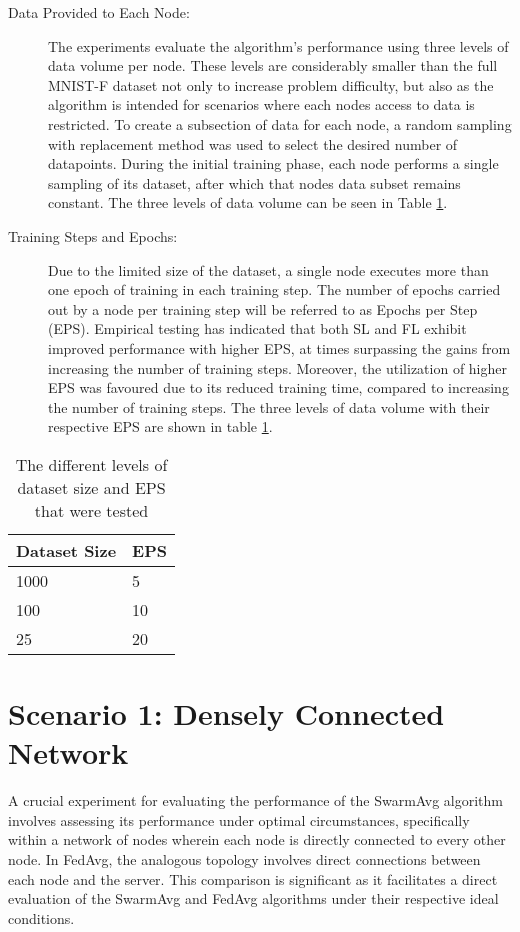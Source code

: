 \begin{description}
	\item [Data Provided to Each Node:] The experiments evaluate the algorithm's performance using three levels of data volume per node. These levels are considerably smaller than the full MNIST-F dataset not only to increase problem difficulty, but also as the algorithm is intended for scenarios where each nodes access to data is restricted. To create a subsection of data for each node, a random sampling with replacement method was used to select the desired number of datapoints. During the initial training phase, each node performs a single sampling of its dataset, after which that nodes data subset remains constant. The three levels of data volume can be seen in Table \ref{epsparams}.
	
	\item [Training Steps and Epochs:] Due to the limited size of the dataset, a single node executes more than one epoch of training in each training step. The number of epochs carried out by a node per training step will be referred to as Epochs per Step (EPS). Empirical testing has indicated that both SL and FL exhibit improved performance with higher EPS, at times surpassing the gains from increasing the number of training steps. Moreover, the utilization of higher EPS was favoured due to its reduced training time, compared to increasing the number of training steps. The three levels of data volume with their respective EPS are shown in table \ref{epsparams}.
	
\end{description}

\begin{table}[H]
	\centering
	\begin{tabular}{l|l}
		Dataset Size & EPS \\ \hline \hline
		1000   & 5  \\ \hline
		100   & 10  \\ \hline
		25  & 20 
	\end{tabular}
	\caption{The different levels of dataset size and EPS that were tested} \label{epsparams}
\end{table}

\section{Scenario 1: Densely Connected Network}
A crucial experiment for evaluating the performance of the SwarmAvg algorithm involves assessing its performance under optimal circumstances, specifically within a network of nodes wherein each node is directly connected to every other node. In FedAvg, the analogous topology involves direct connections between each node and the server. This comparison is significant as it facilitates a direct evaluation of the SwarmAvg and FedAvg algorithms under their respective ideal conditions.

